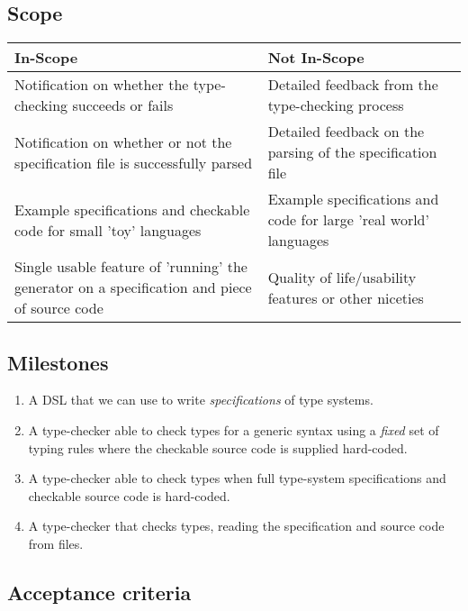   \subsection{Scope}
  \label{sec-scope}

  \begin{center}
  \begin{tabular}{p{20em}|p{18em}}
    \large In-Scope & \large Not In-Scope \\ \hline \hline
    Notification on whether the type-checking succeeds
    or fails
    & Detailed feedback from the type-checking process \\ \hline
    Notification on whether or not the specification file is
    successfully parsed
    & Detailed feedback on the parsing of the specification file \\ \hline
    Example specifications and checkable code for small 'toy' languages
    & Example specifications and code for large 'real world' languages \\ \hline
    Single usable feature of 'running' the generator on a
    specification and piece of source code
    & Quality of life/usability features or other niceties \\ \hline
  \end{tabular}            
  \end{center}        
  
  \subsection{Milestones}
  \label{section-milestones}

  \begin{enumerate}
  \item A DSL that we can use to write \emph{specifications}
    of type systems.
  \item A type-checker able to check types for a generic syntax
    using a \emph{fixed} set of typing rules where the checkable
    source code is supplied hard-coded.
  \item A type-checker able to check types when full type-system
    specifications and checkable source code is hard-coded.
  \item A type-checker  that checks types, reading
    the specification and source code from files.
  \end{enumerate}
  
  \subsection{Acceptance criteria}
  \label{sec-acceptance}

